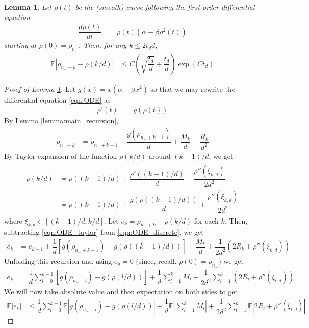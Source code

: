 \documentclass[12pt]{article}
\newtheorem{lemma}[theorem]{Lemma}      %
\newcommand{\E}{\mathbb{E}}
\begin{document}
\medskip

\begin{lemma}\label{lemma:ode_tracking}
    Let $\rho(t)$ be the (smooth) curve following the first order differential equation
    \begin{align}\label{eqn:ODE}
        \dfrac{d\rho(t)}{dt} &= \rho(t)(\alpha - \beta\rho^2(t))
    \end{align}starting at $\rho(0)=\rho_{n_-}$. Then, for any $k\leq 2t_d d$,
    \begin{align*}
        \E|\rho_{n_-+k}-\rho(k/d)|&\leq C\left(\sqrt{\dfrac{t_d}{d}}+\dfrac{t_d}{d}\right)\exp(Ct_d)
    \end{align*}
\end{lemma}

\begin{proof}[Proof of Lemma \ref{lemma:ode_tracking}]
    Let $g(x)=x(\alpha - \beta x^2)$ so that we may rewrite the differential equation \ref{eqn:ODE} as
    \begin{align*}
        \rho'(t) &= g(\rho(t))
    \end{align*}
    By Lemma \ref{lemma:main_recursion},
    \begin{align}\label{eqn:ODE_discrete}
        \rho_{n_-+k} &= \rho_{n_-+k-1}+\dfrac{g(\rho_{n_-+k-1})}{d}+\dfrac{M_k}{d}+\dfrac{R_k}{d^2}
    \end{align}
    By Taylor expansion of the function $\rho(k/d)$ around $(k-1)/d$, we get
    \begin{align}\label{eqn:ODE_taylor}
    \begin{split}
    \rho(k/d) &= \rho((k-1)/d) + \dfrac{\rho'((k-1)/d)}{d} + \dfrac{\rho''(\xi_{k,d})}{2d^2} \\
    &= \rho((k-1)/d) + \dfrac{g(\rho((k-1)/d))}{d} + \dfrac{\rho''(\xi_{k,d})}{2d^2}
    \end{split}
    \end{align}where $\xi_{k,d}\in[(k-1)/d,k/d]$. Let $e_k=\rho_{n_-+k}-\rho(k/d)$ for each $k$. Then, subtracting \ref{eqn:ODE_taylor} from \ref{eqn:ODE_discrete}, we get
    \begin{align*}
        e_k &= e_{k-1} + \dfrac{1}{d}[g(\rho_{n_-+k-1})-g(\rho((k-1)/d))] + \dfrac{M_k}{d} + \dfrac{1}{2d^2}\left(2R_k+\rho''(\xi_{k,d})\right)
    \end{align*}Unfolding this recursion and using $e_0=0$ (since, recall, $\rho(0)=\rho_{n_-}$) we get
    \begin{align*}
        e_k &= \dfrac{1}{d}\sum_{l=0}^{k-1}[g(\rho_{n_-+l})-g(\rho(l/d))] + \dfrac{1}{d}\sum_{l=1}^k M_l + \dfrac{1}{2d^2}\sum_{l=1}^k (2R_l+\rho''(\xi_{l,d}))
    \end{align*} We will now take absolute value and then expectation on both sides to get
    \begin{align*}
        \E|e_k| &\leq \dfrac{1}{d}\sum_{l=0}^{k-1}\E|g(\rho_{n_-+l})-g(\rho(l/d))| + \dfrac{1}{d}\E\left|\sum_{l=1}^k M_l\right| + \dfrac{1}{2d^2}\sum_{l=1}^k \E|2R_l+\rho''(\xi_{l,d})|
    \end{align*}
    

\end{proof}
\end{document}
